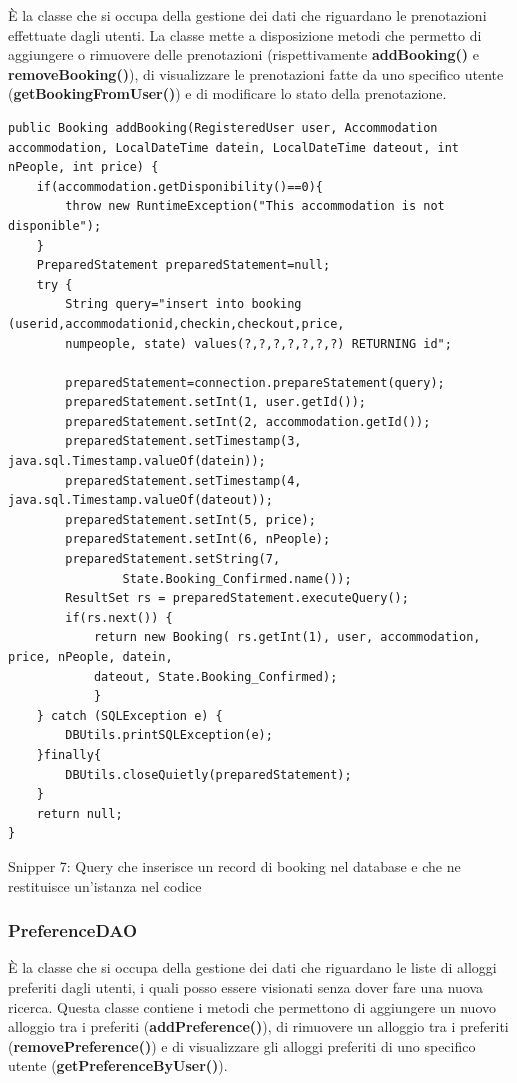 \documentclass[10pt]{article}
\begin{document}
\`E la classe che si occupa della gestione dei dati che riguardano le prenotazioni effettuate dagli utenti. La classe mette a disposizione metodi che permetto di aggiungere o rimuovere delle prenotazioni (rispettivamente \textbf{addBooking()} e \textbf{removeBooking()}), di visualizzare le prenotazioni fatte da uno specifico utente (\textbf{getBookingFromUser()}) e di modificare lo stato della prenotazione.
\par\medskip
\begin{lstlisting}
public Booking addBooking(RegisteredUser user, Accommodation accommodation, LocalDateTime datein, LocalDateTime dateout, int nPeople, int price) {
    if(accommodation.getDisponibility()==0){
        throw new RuntimeException("This accommodation is not disponible");
    }
    PreparedStatement preparedStatement=null;
    try {
        String query="insert into booking (userid,accommodationid,checkin,checkout,price,
        numpeople, state) values(?,?,?,?,?,?,?) RETURNING id";
        
        preparedStatement=connection.prepareStatement(query);
        preparedStatement.setInt(1, user.getId());
        preparedStatement.setInt(2, accommodation.getId());
        preparedStatement.setTimestamp(3, java.sql.Timestamp.valueOf(datein));
        preparedStatement.setTimestamp(4, java.sql.Timestamp.valueOf(dateout));
        preparedStatement.setInt(5, price);
        preparedStatement.setInt(6, nPeople);
        preparedStatement.setString(7,
                State.Booking_Confirmed.name());
        ResultSet rs = preparedStatement.executeQuery();
        if(rs.next()) {
            return new Booking( rs.getInt(1), user, accommodation, price, nPeople, datein, 
            dateout, State.Booking_Confirmed);
            }
    } catch (SQLException e) {
        DBUtils.printSQLException(e);
    }finally{
        DBUtils.closeQuietly(preparedStatement);
    }
    return null;
}
\end{lstlisting}
\begin{center}
    \par
Snipper 7: Query che inserisce un record di booking nel database e che ne restituisce un'istanza nel codice
    \par\medskip
\end{center}
\subsubsection{PreferenceDAO}

\`E la classe che si occupa della gestione dei dati che riguardano le liste di alloggi preferiti dagli utenti, i quali posso essere visionati senza dover fare una nuova ricerca. Questa classe contiene i metodi che permettono di aggiungere un nuovo alloggio tra i preferiti (\textbf{addPreference()}), di rimuovere un alloggio tra i preferiti (\textbf{removePreference()}) e di visualizzare gli alloggi preferiti di uno specifico utente (\textbf{getPreferenceByUser()}). 
\end{document}
